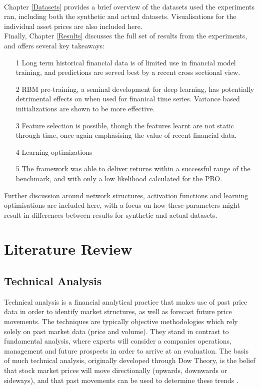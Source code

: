 \documentclass[a4paper,11pt,oneside]{article}
\theoremstyle{plain}
\theoremstyle{definition}
\begin{document}
~\\\newline
Chapter \ref{Datasets} provides a brief overview of the datasets used the experiments ran, including both the synthetic and actual datasets. Visualisations for the individual asset prices are also included here.
~\\\newline
Finally, Chapter \ref{Results} discusses the full set of results from the experiments, and offers several key takeaways:
\begin{itemize}
	\item[1] Long term historical financial data is of limited use in financial model training, and predictions are served best by a recent cross sectional view.
	\item[2] RBM pre-training, a seminal development for deep learning, has potentially detrimental effects on when used for finanical time series. Variance based initializations are shown to be more effective.
	\item[3] Feature selection is possible, though the features learnt are not static through time, once again emphasising the value of recent financial data.	 
	\item[4] Learning optimizations 
	\item[5] The framework was able to deliver returns within a successful range of the benchmark, and with only a low likelihood calculated for the PBO.
\end{itemize}
Further discussion around network structures, activation functions and learning optimisations are included here, with a focus on how these parameters might result in differences between results for synthetic and actual datasets.


\newpage
\section{Literature Review}\label{lr_LiteratureReview}
\subsection{Technical Analysis}\label{lr_TechnicalAnalysis}

Technical analysis is a financial analytical practice that makes use of past price data in order to identify market 
structures, as well as forecast future price movements. The techniques are typically objective methodologies 
which rely solely on past market data (price and volume). They stand in contrast to fundamental analysis, where 
experts will consider a companies operations, management and future prospects in order to arrive at an evaluation. 
The basis of much technical analysis, originally developed through Dow Theory, is the belief that stock market 
prices will move directionally (upwards, downwards or sideways), and that past movements can be used to 
determine these trends  \cite {Murphy}.
\hfill \break 
\end{document}

